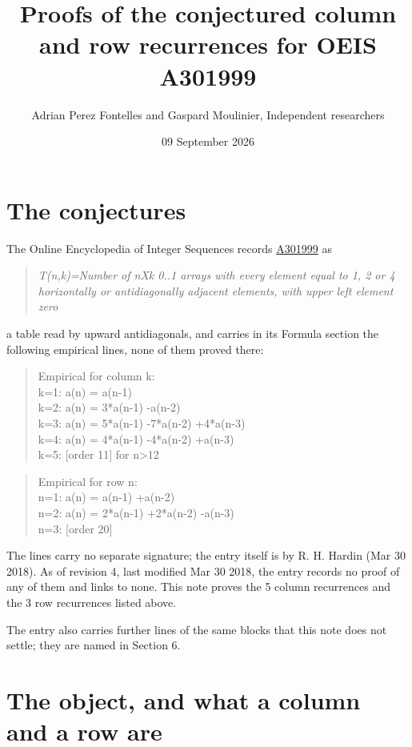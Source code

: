 \documentclass[11pt]{article}
\title{Proofs of the conjectured column and row recurrences for OEIS A301999}
\author{Adrian Perez Fontelles and Gaspard Moulinier, Independent researchers}
\date{09 September 2026}
\theoremstyle{definition}
\begin{document}
\maketitle
\section{The conjectures}

The Online Encyclopedia of Integer Sequences records \href{https://oeis.org/A301999}{A301999} as

\begin{quote}\itshape T(n,k)=Number of nXk 0..1 arrays with every element equal to 1, 2 or 4 horizontally or antidiagonally adjacent elements, with upper left element zero\end{quote}

a table read by upward antidiagonals, and carries in its Formula section the following empirical lines, none of them proved there:

\begin{quote}\ttfamily Empirical for column k:\\
k=1: a(n) = a(n-1)\\k=2: a(n) = 3*a(n-1) -a(n-2)\\k=3: a(n) = 5*a(n-1) -7*a(n-2) +4*a(n-3)\\k=4: a(n) = 4*a(n-1) -4*a(n-2) +a(n-3)\\k=5: [order 11] for n>12\end{quote}

\begin{quote}\ttfamily Empirical for row n:\\
n=1: a(n) = a(n-1) +a(n-2)\\n=2: a(n) = 2*a(n-1) +2*a(n-2) -a(n-3)\\n=3: [order 20]\end{quote}

The lines carry no separate signature; the entry itself is by R. H. Hardin (Mar 30 2018). As of revision 4, last modified Mar 30 2018, the entry records no proof of any of them and links to none. This note proves the 5 column recurrences and the 3 row recurrences listed above.

The entry also carries further lines of the same blocks that this note does not settle; they are named in Section 6.

\section{The object, and what a column and a row are}
\end{document}
